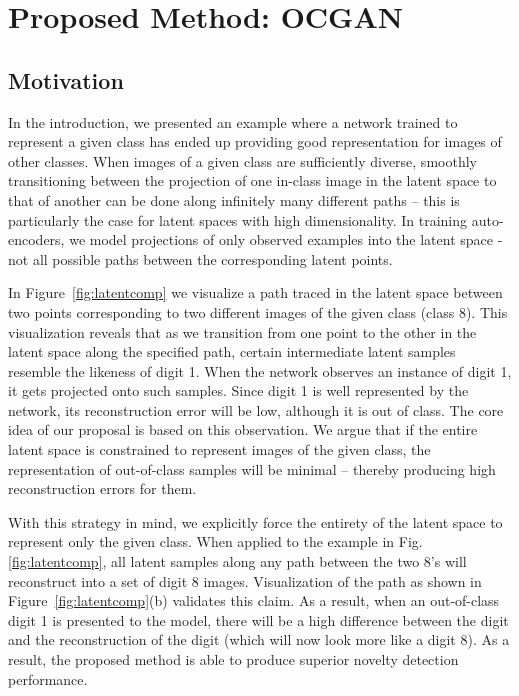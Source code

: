 \documentclass[10pt,twocolumn,letterpaper]{article}
\begin{document}
\section{Proposed Method: OCGAN}



\subsection{Motivation}

In the introduction, we presented an example where a network trained to represent a given class has ended up providing good representation for images of other classes. When images of a given class are sufficiently diverse, smoothly transitioning between the projection of one in-class image in the latent space to that of another can be done along infinitely many different paths -- this is particularly the case for latent spaces with high dimensionality. In training auto-encoders, we model projections of only observed examples into the latent space - not all possible paths between the corresponding latent points.

In Figure~\ref{fig:latentcomp} we visualize a path traced in the latent space between two points corresponding to two different images of the given class (class 8). This visualization reveals that as we transition from one point to the other in the latent space along the specified path, certain intermediate latent samples resemble the likeness of digit 1. When the network observes an instance of digit 1, it gets projected onto such samples. Since digit 1 is well represented by the network, its reconstruction error will be low, although it is out of class. The core idea of our proposal is based on this observation. We argue that if the entire latent space is constrained to represent images of the given class, the representation of out-of-class samples will be minimal -- thereby producing high reconstruction errors for them.

With this strategy in mind, we explicitly force the entirety of the latent space to represent only the given class. When applied to the example in Fig. \ref{fig:latentcomp}, all latent samples along any path between the two 8's will reconstruct into a set of digit 8 images. Visualization of the path as shown in Figure~\ref{fig:latentcomp}(b) validates this claim. As a result, when an out-of-class digit 1 is presented to the model, there will be a high difference between the digit and the reconstruction of the digit (which will now look more like a digit 8). As a result, the proposed method is able to produce superior novelty detection performance.
\end{document}
